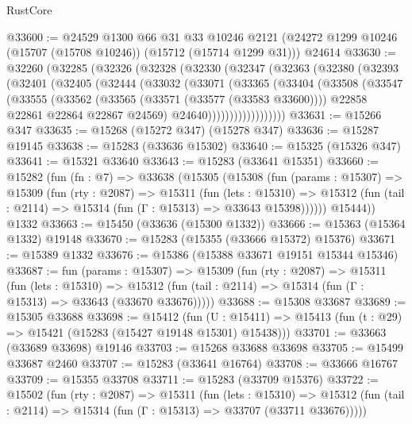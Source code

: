 \begin{lexlean}{RustCore}
\begin{coremodule}
@33600 := @24529
    @1300
    @66
    @31
    @33
    @10246
    @2121
    (@24272 @1299 @10246 (@15707 (@15708 @10246)) (@15712 (@15714 @1299 @31)))
    @24614
@33630 := @32260
    (@32285
      (@32326
        (@32328
          (@32330
            (@32347
              (@32363
                (@32380
                  (@32393
                    (@32401
                      (@32405
                        (@32444
                          (@33032
                            (@33071
                              (@33365
                                (@33404
                                  (@33508
                                    (@33547
                                      (@33555
                                        (@33562
                                          (@33565 (@33571 (@33577 (@33583 @33600))))
                                          @22858
                                          @22861
                                          @22864
                                          @22867
                                          @24569)
                                        @24640))))))))))))))))))
@33631 := @15266 @347
@33635 := @15268 (@15272 @347) (@15278 @347)
@33636 := @15287 @19145
@33638 := @15283 (@33636 @15302)
@33640 := @15325 (@15326 @347)
@33641 := @15321 @33640
@33643 := @15283 (@33641 @15351)
@33660 := @15282
    (fun (fn : @7) =>
    @33638
      (@15305
        (@15308
          (fun (params : @15307) =>
          @15309
            (fun (rty : @2087) =>
            @15311
              (fun (lets : @15310) =>
              @15312 (fun (tail : @2114) => @15314 (fun (Γ : @15313) => @33643 @15398))))))
        @15444))
    @1332
@33663 := @15450 (@33636 (@15300 @1332))
@33666 := @15363 (@15364 @1332) @19148
@33670 := @15283 (@15355 (@33666 @15372) @15376)
@33671 := @15389 @1332
@33676 := @15386 (@15388 @33671 @19151 @15344 @15346)
@33687 := fun (params : @15307) =>
  @15309
    (fun (rty : @2087) =>
    @15311
      (fun (lets : @15310) =>
      @15312 (fun (tail : @2114) => @15314 (fun (Γ : @15313) => @33643 (@33670 @33676)))))
@33688 := @15308 @33687
@33689 := @15305 @33688
@33698 := @15412
    (fun (U : @15411) => @15413 (fun (t : @29) => @15421 (@15283 (@15427 @19148 @15301) @15438)))
@33701 := @33663 (@33689 @33698) @19146
@33703 := @15268 @33688 @33698
@33705 := @15499 @33687 @2460
@33707 := @15283 (@33641 @16764)
@33708 := @33666 @16767
@33709 := @15355 @33708
@33711 := @15283 (@33709 @15376)
@33722 := @15502
    (fun (rty : @2087) =>
    @15311
      (fun (lets : @15310) =>
      @15312 (fun (tail : @2114) => @15314 (fun (Γ : @15313) => @33707 (@33711 @33676)))))

\end{coremodule}
\end{lexlean}
